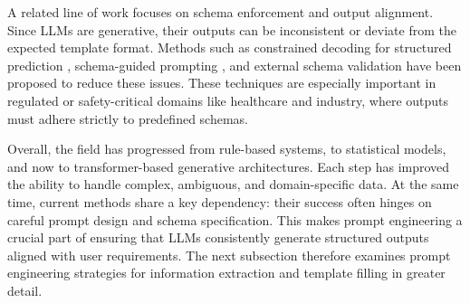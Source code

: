 A related line of work focuses on schema enforcement and output alignment. Since LLMs are generative, their outputs can be inconsistent or deviate from the expected template format. Methods such as constrained decoding for structured prediction \cite{anderson2017guided}, schema-guided prompting \cite{zhang2023sgptod}, and external schema validation have been proposed to reduce these issues. These techniques are especially important in regulated or safety-critical domains like healthcare and industry, where outputs must adhere strictly to predefined schemas.

Overall, the field has progressed from rule-based systems, to statistical models, and now to transformer-based generative architectures. Each step has improved the ability to handle complex, ambiguous, and domain-specific data. At the same time, current methods share a key dependency: their success often hinges on careful prompt design and schema specification. This makes prompt engineering a crucial part of ensuring that LLMs consistently generate structured outputs aligned with user requirements. The next subsection therefore examines prompt engineering strategies for information extraction and template filling in greater detail.

